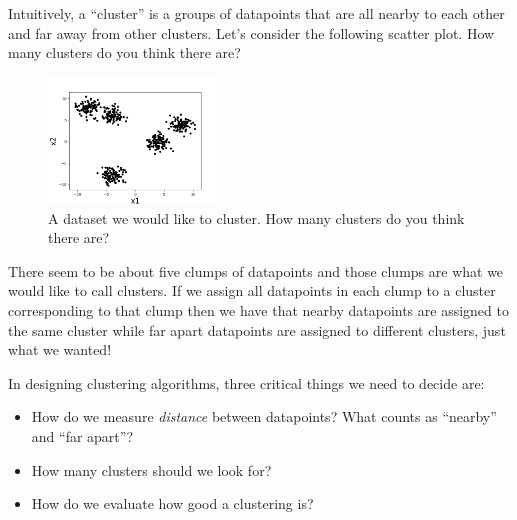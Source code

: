 \documentclass[11pt]{article}
\begin{document}


Intuitively, a ``cluster'' is a groups of datapoints that are all nearby to each other and far away from other clusters. Let's consider the following scatter plot. How many clusters do you think there are?

\begin{figure}[h]
    \centering
    \includegraphics[width=0.40\textwidth]{figures/kmeans_fig1.png}
    \caption{A dataset we would like to cluster. How many clusters do you think there are?}
    \label{fig:kmeans_fig1}
\end{figure}

There seem to be about five clumps of datapoints and those clumps are what we would like to call clusters. If we assign all datapoints in each clump to a cluster corresponding to that clump then we have that nearby datapoints are assigned to the same cluster while far apart datapoints are assigned to different clusters, just what we wanted!

In designing clustering algorithms, three critical things we need to decide are:
\begin{itemize}
    \item How do we measure \textit{distance} between datapoints? What counts as ``nearby'' and ``far apart''?
    \item How many clusters should we look for?
    \item How do we evaluate how good a clustering is?
\end{itemize}
\end{document}
